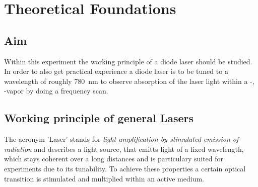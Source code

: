 \section{Theoretical Foundations}
    \subsection{Aim}
        Within this experiment the working principle of a diode laser should be studied. In order to also get practical experience a diode laser is to be tuned to a wavelength of roughly \SI{780}{\nano\metre}
        to observe absorption of the laser light within a -, -vapor by doing a frequency scan. 
    
    \subsection{Working principle of general Lasers}
        The acronym 'Laser' stands for \textit{light amplification by stimulated emission of radiation} and describes a light source, that emitts light of a fixed wavelength, which stays coherent over a long
        distances and is particulary suited for experiments due to its tunability. To achieve these properties a certain optical transition is stimulated and multiplied within an active medium.


